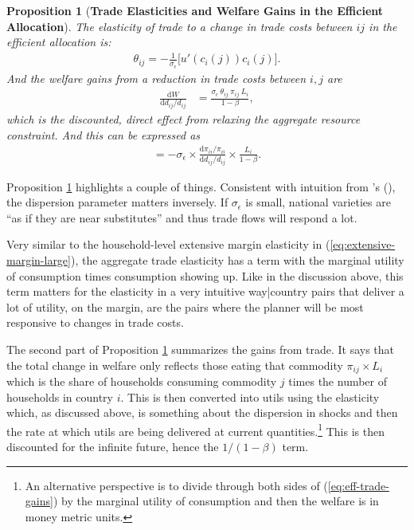 \documentclass[12pt,pdftex]{article}
\newtheorem{prp}{Proposition}
\def\citeapos#1{\citeauthor{#1}'s (\citeyear{#1})}
\begin{document}
\begin{onehalfspacing}
\begin{prp}[\textbf{Trade Elasticities and Welfare Gains in the Efficient Allocation}]\label{prp:gains-efficient-allocation} The elasticity of trade to a change in trade costs between $ij$ in the efficient allocation is:
\begin{align}
\theta_{ij} =  -\frac{1}{\sigma_{\epsilon}} \bigg [ u'(c_{i}(j)) c_{i}(j) \bigg]. \label{eq:eff-trade-elasticity}
\end{align}
And the welfare gains from a reduction in trade costs between $i,j$ are
\begin{align}
\frac{\mathrm{d} W }{\mathrm{d} d_{ij} / d_{ij}} &= \frac{\sigma_{\epsilon} \  \theta_{ij} \  \pi_{ij} \ L_i}{1-\beta},
\label{eq:eff-trade-gains}
\end{align}
which is the discounted, direct effect from relaxing the aggregate resource constraint. And this can be expressed as
\begin{align}
= -\sigma_{\epsilon} \times \frac{\mathrm{d} \pi_{ii} / \pi_{ii}}{\mathrm{d} d_{ij} / d_{ij}} \times \frac{L_i}{1 - \beta}.
\label{eq:eff-trade-gains-acr}
\end{align}
\end{prp}
Proposition \ref{prp:gains-efficient-allocation} highlights a couple of things. Consistent with intuition from \citeapos{eaton2002technology}, the dispersion parameter matters inversely. If $\sigma_{\epsilon}$ is small, national varieties are ``as if they are near substitutes'' and thus trade flows will respond a lot.

Very similar to the household-level extensive margin elasticity in (\ref{eq:extensive-margin-large}), the aggregate trade elasticity has a term with the marginal utility of consumption times consumption showing up. Like in the discussion above, this term matters for the elasticity in a very intuitive way|country pairs that deliver a lot of utility, on the margin, are the pairs where the planner will be most responsive to changes in trade costs.

The second part of Proposition \ref{prp:gains-efficient-allocation} summarizes the gains from trade. It says that the total change in welfare only reflects those eating that commodity $\pi_{ij} \times L_i$ which is the share of households consuming commodity $j$ times the number of households in country $i$. This is then converted into utils using the elasticity which, as discussed above, is something about the dispersion in shocks and then the rate at which utils are being delivered at current quantities.\footnote{An alternative perspective is to divide through both sides of (\ref{eq:eff-trade-gains}) by the marginal utility of consumption and then the welfare is in money metric units.} This is then discounted for the infinite future, hence the $1/ (1-\beta)$ term.


\end{onehalfspacing}
\end{document}
